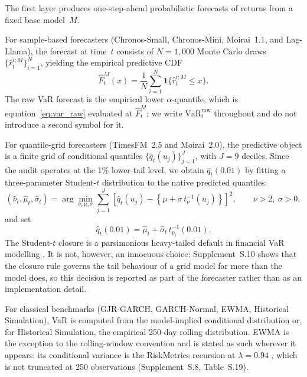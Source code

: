 \documentclass[preprint,11pt,authoryear]{elsarticle}
\newcommand{\VaR}{\mathrm{VaR}}
\newcommand{\1}{\boldsymbol{1}}
\begin{document}
The first layer produces one-step-ahead probabilistic forecasts of returns from a fixed base model~$M$.

For sample-based forecasters (Chronos-Small, Chronos-Mini, Moirai~1.1, and Lag-Llama), the forecast at time~$t$ consists of $N = 1{,}000$ Monte Carlo draws $\{\hat r_t^{i;M}\}_{i=1}^N$, yielding the empirical predictive CDF
\begin{equation}
	\label{eq:ecdf_sample}
	\widehat F_t^M(x)
	= \frac{1}{N}\sum_{i=1}^{N}
	\mathbf{1}\{\hat r_t^{i;M}\leq x\}.
\end{equation}
The raw VaR forecast is the empirical lower $\alpha$-quantile, which is
equation~\eqref{eq:var_raw} evaluated at $\widehat F_t^M$; we write
$\VaR_t^{\mathrm{raw}}$ throughout and do not introduce a second symbol for it.

For quantile-grid forecasters (TimesFM~2.5 and Moirai~2.0), the predictive object is a finite grid of conditional quantiles $\{\hat q_t(u_j)\}_{j=1}^{J}$, with $J = 9$ deciles. Since the audit operates at the 1\% lower-tail level, we obtain $\hat q_t(0.01)$ by fitting a three-parameter Student-$t$ distribution to the native predicted quantiles:
\begin{equation}
	\label{eq:tail_completion}
	(\hat\nu_t, \hat\mu_t, \hat\sigma_t)
	=
	\arg\min_{\nu, \mu, \sigma}
	\sum_{j=1}^{J}
	\left[
	\hat q_t(u_j)
	-
	\left\{
	\mu + \sigma\, t_{\nu}^{-1}(u_j)
	\right\}
	\right]^2,
	\qquad \nu > 2,\ \sigma > 0,
\end{equation}
and set
\begin{equation}
	\label{eq:var_grid}
	\hat q_t(0.01)
	=
	\hat\mu_t + \hat\sigma_t\, t_{\hat\nu_t}^{-1}(0.01).
\end{equation}
The Student-$t$ closure is a parsimonious heavy-tailed default in financial VaR modelling \citep{bollerslev1987,hansen1994autoregressive,mcneil2000estimation}. It is not, however, an innocuous choice: Supplement~S.10 shows that the closure rule governs the tail behaviour of a grid model far more than the model does, so this decision is reported as part of the forecaster rather than as an implementation detail.

For classical benchmarks (GJR-GARCH, GARCH-Normal, EWMA, Historical Simulation), VaR is computed from the model-implied conditional distribution or, for Historical Simulation, the empirical 250-day rolling distribution. EWMA is the exception to the rolling-window convention and is stated as such wherever it appears: its conditional variance is the RiskMetrics recursion at $\lambda = 0.94$ \citep{riskmetrics1996}, which is not truncated at 250 observations (Supplement~S.8, Table~S.19).
\end{document}
